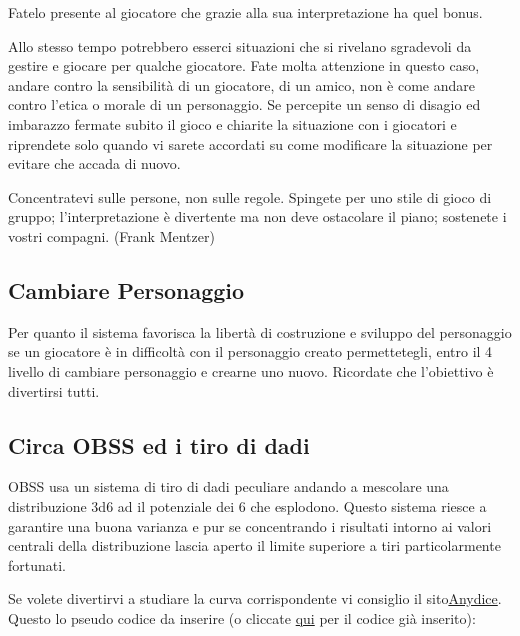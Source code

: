 \begin{multicols}{2}
\medskip

Fatelo presente al giocatore che grazie alla sua interpretazione ha quel bonus.

Allo stesso tempo potrebbero esserci situazioni che si rivelano sgradevoli da gestire e giocare per qualche giocatore. Fate molta attenzione in questo caso, andare contro la sensibilità di un giocatore, di un amico, non è come andare contro l'etica o morale di un personaggio. Se percepite un senso di disagio ed imbarazzo fermate subito il gioco e chiarite la situazione con i giocatori e riprendete solo quando vi sarete accordati su come modificare la situazione per evitare che accada di nuovo.

\begin{enfasi}
{Concentratevi sulle persone, non sulle regole. Spingete per uno stile di gioco di gruppo; l'interpretazione è divertente ma non deve ostacolare il piano; sostenete i vostri compagni. (Frank Mentzer)}\end{enfasi}

\subsection{Cambiare Personaggio}

Per quanto il sistema favorisca la libertà di costruzione e sviluppo del personaggio se un giocatore è in difficoltà con il personaggio creato permettetegli, entro il 4 livello di cambiare personaggio e crearne uno nuovo. Ricordate che l'obiettivo è divertirsi tutti.

\subsection{Circa OBSS ed i tiro di dadi}\label{obssedadi}

OBSS usa un sistema di tiro di dadi peculiare andando a mescolare una distribuzione 3d6 ad il potenziale dei 6 che esplodono. Questo sistema riesce a garantire una buona varianza e pur se concentrando i risultati intorno ai valori centrali della distribuzione lascia aperto il limite superiore a tiri particolarmente fortunati.

Se volete divertirvi a studiare la curva corrispondente vi consiglio il sito\href{https://anydice.com/}{Anydice}. Questo lo pseudo codice da inserire (o cliccate \href{https://anydice.com/program/2610e}{qui} per il codice già inserito):


\end{multicols}
